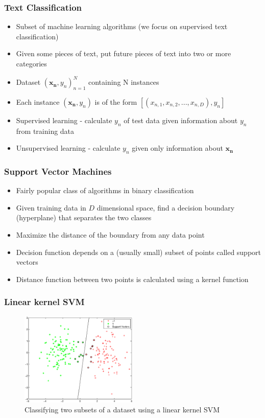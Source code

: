 \documentclass{beamer}
\begin{document}
    \begin{frame}
        \frametitle{Text Classification}
        \begin{itemize}
            \item{Subset of machine learning algorithms (we focus on supervised text classification)}
            \item{Given some pieces of text, put future pieces of text into two or more categories}
            \item{Dataset ${(\mathbf{x_n}, y_n)}_{n = 1}^{N}$ containing N instances}
            \item{Each instance $(\mathbf{x_n}, y_n)$ is of the form $[(x_{n, 1}, x_{n, 2}, ..., x_{n, D}), y_n]$}
            \item{Supervised learning - calculate $y_n$ of test data given information about $y_n$ from training data}
            \item{Unsupervised learning - calculate $y_n$ given only information about $\mathbf{x_n}$}
        \end{itemize}
    \end{frame}
    
    \begin{frame}
        \frametitle{Support Vector Machines}
        \begin{itemize}
            \item{Fairly popular class of algorithms in binary classification}
            \item{Given training data in $D$ dimensional space, find a decision boundary (hyperplane) that separates the two classes}
            \item{Maximize the distance of the boundary from any data point}
            \item{Decision function depends on a (usually small) subset of points called support vectors}
            \item{Distance function between two points is calculated using a kernel function}
        \end{itemize}
    \end{frame}
    
    \begin{frame}
        \frametitle{Linear kernel SVM}
        \begin{figure}
            \centering
            \includegraphics[width=0.5\textwidth]{figures/svm_linear_classification.eps}
            \caption{Classifying two subsets of a dataset using a linear kernel SVM}
        \end{figure}
    \end{frame}
    
\end{document}
